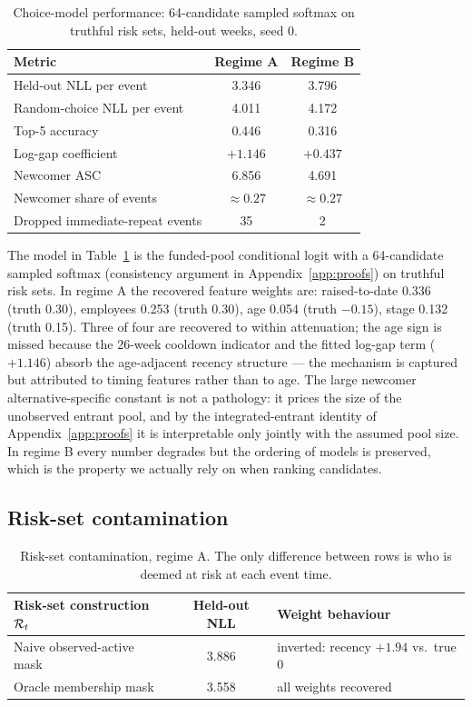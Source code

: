 \begin{table}[htbp]
\centering
\small
\begin{tabular}{lcc}
\toprule
Metric & Regime A & Regime B \\
\midrule
Held-out NLL per event & 3.346 & 3.796 \\
Random-choice NLL per event & 4.011 & 4.172 \\
Top-5 accuracy & 0.446 & 0.316 \\
Log-gap coefficient & $+1.146$ & $+0.437$ \\
Newcomer ASC & 6.856 & 4.691 \\
Newcomer share of events & $\approx 0.27$ & $\approx 0.27$ \\
Dropped immediate-repeat events & 35 & 2 \\
\bottomrule
\end{tabular}
\caption{Choice-model performance: 64-candidate sampled softmax on truthful risk sets, held-out weeks,
seed 0.}
\label{tab:sel-choice}
\end{table}

The model in Table~\ref{tab:sel-choice} is the funded-pool conditional logit with a 64-candidate sampled
softmax (consistency argument in Appendix~\ref{app:proofs}) on truthful risk sets. In regime A the recovered
feature weights are: raised-to-date 0.336 (truth 0.30), employees 0.253 (truth 0.30), age 0.054 (truth
$-0.15$), stage 0.132 (truth 0.15). Three of four are recovered to within attenuation; the age sign is
missed because the 26-week cooldown indicator and the fitted log-gap term ($+1.146$) absorb the age-adjacent
recency structure --- the mechanism is captured but attributed to timing features rather than to age. The
large newcomer alternative-specific constant is not a pathology: it prices the size of the unobserved
entrant pool, and by the integrated-entrant identity of Appendix~\ref{app:proofs} it is interpretable only
jointly with the assumed pool size. In regime B every number degrades but the ordering of models is
preserved, which is the property we actually rely on when ranking candidates.

\subsection{Risk-set contamination}
\label{sec:sel-riskset}

\begin{table}[htbp]
\centering
\small
\begin{tabular}{lcl}
\toprule
Risk-set construction $\mathcal{R}_t$ & Held-out NLL & Weight behaviour \\
\midrule
Naive observed-active mask & 3.886 & inverted: recency $+1.94$ vs.\ true 0 \\
Oracle membership mask & 3.558 & all weights recovered \\
\bottomrule
\end{tabular}
\caption{Risk-set contamination, regime A. The only difference between rows is who is deemed at risk at
each event time.}
\label{tab:sel-riskset}
\end{table}

